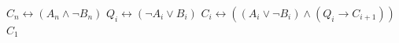\begin{algorithm}[H]
    \caption{Lexicographic Comparison of Streams of Boolean Variables IMPROVED \( A \succ B \)}
    \begin{algorithmic}[1]
        \State $C_n \leftrightarrow (A_n \wedge \neg B_n)$  
            \State $Q_i \leftrightarrow (\neg A_i \vee B_i)$    
            \State $C_i \leftrightarrow ((A_i \vee \neg B_i) \wedge (Q_i \rightarrow C_{i+1}) )$ 
        \EndFor
        \State \Return $C_1$
    \EndFunction
    \end{algorithmic}
    \label{alg:lex-gs-improved}
\end{algorithm}